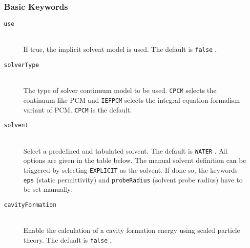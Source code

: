 \documentclass[bibliography=totocnumbered,a4paper,10pt,oneside]{scrbook}
\newcommand{\ttt}[1]{%
  \begingroup\setlength{\fboxsep}{1pt}%
  \colorbox{serenity-green!30}{\texttt{\hspace*{2pt}\vphantom{(g}#1\hspace*{2pt}}}%
  \endgroup
}
\begin{document}
\subsubsection{Basic Keywords}
\begin{description}
  \item [\texttt{use}]\hfill \\
  If true, the implicit solvent model is used. The default is \ttt{false}.
 \item [\texttt{solverType}]\hfill \\
 The type of solver continuum model to be used. \ttt{CPCM} selects the continuum-like PCM and 
 \ttt{IEFPCM} selects the integral equation formalism variant of PCM. \ttt{CPCM} is the default.
 \item [\texttt{solvent}]\hfill \\
 Select a predefined and tabulated solvent. The default is \ttt{WATER}. All options are given in the table below.
 The manual solvent definition can be triggered by selecting \ttt{EXPLICIT} as the solvent. If done so, the keywords 
 \ttt{eps} (static permittivity) and \ttt{probeRadius} (solvent probe radius) have to be set manually.
 \item [\texttt{cavityFormation}]\hfill \\
 Enable the calculation of a cavity formation energy using scaled particle theory. The defualt
 is \ttt{false}.
\end{description}
\end{document}
